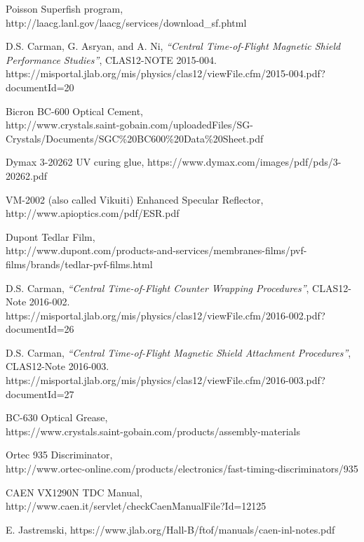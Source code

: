 \documentclass{elsart}
\begin{document}
\begin{thebibliography}{99}
Poisson Superfish program, \\
http://laacg.lanl.gov/laacg/services/download\_sf.phtml

D.S. Carman, G. Asryan, and A. Ni, {\it ``Central Time-of-Flight Magnetic Shield Performance 
Studies''}, CLAS12-NOTE 2015-004.\\
https://misportal.jlab.org/mis/physics/clas12/viewFile.cfm/2015-004.pdf?documentId=20

Bicron BC-600 Optical Cement,\\
http://www.crystals.saint-gobain.com/uploadedFiles/SG-Crystals/Documents/SGC\%20BC600\%20Data\%20Sheet.pdf

Dymax 3-20262 UV curing glue, https://www.dymax.com/images/pdf/pds/3-20262.pdf
  
VM-2002 (also called Vikuiti) Enhanced Specular Reflector, \\
http://www.apioptics.com/pdf/ESR.pdf

Dupont Tedlar Film,\\
http://www.dupont.com/products-and-services/membranes-films/pvf-films/brands/tedlar-pvf-films.html

D.S. Carman, {\it ``Central Time-of-Flight Counter Wrapping Procedures''}, CLAS12-Note 2016-002.\\
https://misportal.jlab.org/mis/physics/clas12/viewFile.cfm/2016-002.pdf?documentId=26

D.S. Carman, {\it ``Central Time-of-Flight Magnetic Shield Attachment Procedures''}, CLAS12-Note 
2016-003.\\
https://misportal.jlab.org/mis/physics/clas12/viewFile.cfm/2016-003.pdf?documentId=27

BC-630 Optical Grease,\\
https://www.crystals.saint-gobain.com/products/assembly-materials
  
Ortec 935 Discriminator, \\
http://www.ortec-online.com/products/electronics/fast-timing-discriminators/935

CAEN VX1290N TDC Manual,\\
http://www.caen.it/servlet/checkCaenManualFile?Id=12125
  
E. Jastremski, https://www.jlab.org/Hall-B/ftof/manuals/caen-inl-notes.pdf


\end{thebibliography}
\end{document}

